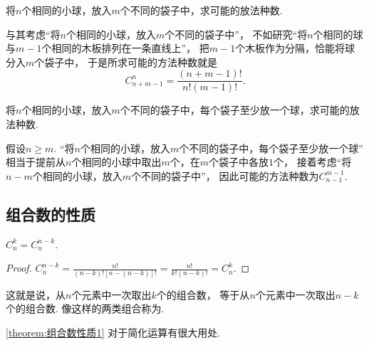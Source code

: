 \begin{example}
将\(n\)个相同的小球，放入\(m\)个不同的袋子中，求可能的放法种数.
\begin{solution}
与其考虑“将\(n\)个相同的小球，放入\(m\)个不同的袋子中”，
不如研究“将\(n\)个相同的球与\(m-1\)个相同的木板排列在一条直线上”，
把\(m-1\)个木板作为分隔，恰能将球分入\(m\)个袋子中，
于是所求可能的方法种数就是\begin{equation*}
	C_{n+m-1}^n
	= \frac{
		(n + m-1)!
	}{
		n! (m-1)!
	}.
\end{equation*}
\end{solution}
\end{example}

\begin{example}
将\(n\)个相同的小球，放入\(m\)个不同的袋子中，每个袋子至少放一个球，求可能的放法种数.
\begin{solution}
假设\(n \geq m\).
“将\(n\)个相同的小球，放入\(m\)个不同的袋子中，每个袋子至少放一个球”
相当于提前从\(n\)个相同的小球中取出\(m\)个，在\(m\)个袋子中各放\(1\)个，
接着考虑“将\(n-m\)个相同的小球，放入\(m\)个不同的袋子中”，
因此可能的方法种数为\(C_{n-1}^{m-1}\).
\end{solution}
\end{example}

\subsection{组合数的性质}
\begin{property}\label{theorem:组合数性质1}
\(C_n^k = C_n^{n-k}\).
\begin{proof}
\(
C_n^{n-k}
= \frac{n!}{(n-k)! [n-(n-k)]!}
= \frac{n!}{k! (n-k)!}
= C_n^k
\).
\end{proof}
\end{property}
这就是说，从\(n\)个元素中一次取出\(k\)个的组合数，
等于从\(n\)个元素中一次取出\(n-k\)个的组合数.
像这样的两类组合称为.

\cref{theorem:组合数性质1} 对于简化运算有很大用处.

